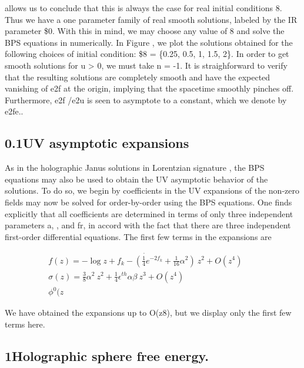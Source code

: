 \documentclass{article}
\begin{document}
\sloppy

allows us to conclude that this is always the case for real initial conditions 8. Thus we
have a one parameter family of real smooth solutions, labeled by the IR parameter \$0. With
this in mind, we may choose any value of 8 and solve the BPS equations in numerically.
In Figure , we plot the solutions obtained for the following choices of initial condition:
\$8 = \{0.25, 0.5, 1, 1.5, 2\}. In order to get smooth solutions for u > 0, we must take n = -1.
It is straighforward to verify that the resulting solutions are completely smooth and have
the expected vanishing of e2f at the origin, implying that the spacetime smoothly pinches
off. Furthermore, e2f /e2u is seen to asymptote to a constant, which we denote by e2fe..


\subsection*{0.1UV asymptotic expansions}


As in the holographic Janus solutions in Lorentzian signature , the BPS equations may also
be used to obtain the UV asymptotic behavior of the solutions.  To do so, we begin by
coefficients in the UV expansions of the non-zero fields may now be solved for order-by-order
using the BPS equations. One finds explicitly that all coefficients are determined in terms of
only three independent parameters a, , and fr, in accord with the fact that there are three
independent first-order differential equations. The first few terms in the expansions are


\begin{equation}
\begin{array} { c } { \dot { f ( z ) = - \log z + f _ { k } - \left ( \frac { 1 } { 4 } e ^ { - 2 f _ { k } } + \frac { 1 } { 1 6 } \alpha ^ { 2 } \right ) ~ z ^ { 2 } + O ( z ^ { 4 } ) } \quad } & { } \\ { \sigma ( z ) = \frac { 3 } { 8 } \alpha ^ { 2 } ~ z ^ { 2 } + \frac { 1 } { 4 } \epsilon ^ { t h } \alpha \beta ~ z ^ { 3 } + O ( z ^ { 4 } ) \quad } & { } \\ { \phi ^ { 0 } ( z}\end{array}
\end{equation}


We have obtained the expansions up to O(z8), but we display only the first few terms here.


\subsection*{1Holographic sphere free energy.}
\end{document}
